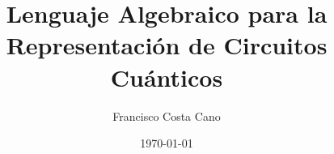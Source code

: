 \documentclass[]{article}
\begin{document}
\title{Lenguaje Algebraico para la Representación de Circuitos Cuánticos}
\date{\today}
\author{Francisco Costa Cano}

%
\maketitle

%







%
%
%
%
\printbibliography
\end{document}
